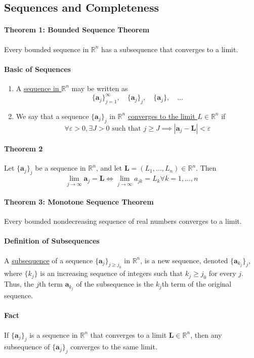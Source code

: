 \documentclass[11pt]{article}
\newcommand{\tb}[1]{\textbf{#1}}
\newcommand{\real}[0]{\mathbb{R}}
\newcommand{\under}[1]{\underline{#1}}
\newcommand{\va}[0]{\tb{a}}
\newcommand{\vL}[0]{\tb{L}}
\begin{document}
\subsection{Sequences and Completeness}
\paragraph{Theorem 1: Bounded Sequence Theorem} Every bounded sequence in $\real^n$ has a subsequence that converges to a limit.
\paragraph{Basic of Sequences}
\begin{enumerate}
	\item A \under{sequence in $\real^n$} may be written as
	$$\{\va_j\}_{j=1}^\infty, \quad \{\va_j\}_j, \quad \{\va_j\}, \quad \hdots$$
	\item We say that a sequence $\{\va_j\}_j$ in $\real^n$ \under{converges to the limit $L \in \real^n$} if
	$$ \forall \varepsilon > 0, \exists J > 0 \mbox{ such that } j\geq J \implies |\va_j - \vL| < \varepsilon$$
\end{enumerate}
\paragraph{Theorem 2} Let $\{\va_j\}_j$ be a sequence in $\real^n$, and let $\vL = (L_1, \hdots, L_n) \in \real^n$. Then
$$\underset{j\rightarrow\infty}{\lim} \va_j = \vL \iff \underset{j\rightarrow\infty}{\lim}a_{jk} = L_k \forall k = 1,\hdots,n$$

\paragraph{Theorem 3: Monotone Sequence Theorem} Every bounded nondecreasing sequence of real numbers converges to a limit.

\paragraph{Definition of Subsequences} A \under{subsequence} of a sequence $\{\va_j\}_{j\geq j_0}$ in $\real^n$, is a new sequence, denoted $\{\va_{k_j}\}_j$, where $\{k_j\}$ is an increasing sequence of integers such that $k_j \geq j_0$ for every $j$. Thus, the $j$th term $\va_{k_j}$ of the subsequence is the $k_j$th term of the original sequence.
\paragraph{Fact} If $\{\va_j\}_j$ is a sequence in $\real^n$ that converges to a limit $\vL \in \real^n$, then any subsequence of $\{\va_j\}_j$ converges to the same limit.
\end{document}
